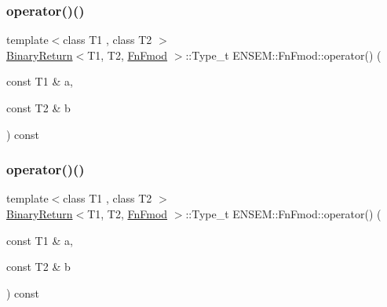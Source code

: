 \subsubsection{\texorpdfstring{operator()()}{operator()()}\hspace{0.1cm}{\footnotesize\ttfamily [1/3]}}
{\footnotesize\ttfamily template$<$class T1 , class T2 $>$ \\
\mbox{\hyperlink{structENSEM_1_1BinaryReturn}{Binary\+Return}}$<$T1, T2, \mbox{\hyperlink{structENSEM_1_1FnFmod}{Fn\+Fmod}} $>$\+::Type\+\_\+t E\+N\+S\+E\+M\+::\+Fn\+Fmod\+::operator() (\begin{DoxyParamCaption}\item[{const T1 \&}]{a,  }\item[{const T2 \&}]{b }\end{DoxyParamCaption}) const\hspace{0.3cm}{\ttfamily [inline]}}

\mbox{\label{structENSEM_1_1FnFmod_a3c0c1761f9aede2a2ec6382073727d3f}} 
\subsubsection{\texorpdfstring{operator()()}{operator()()}\hspace{0.1cm}{\footnotesize\ttfamily [2/3]}}
{\footnotesize\ttfamily template$<$class T1 , class T2 $>$ \\
\mbox{\hyperlink{structENSEM_1_1BinaryReturn}{Binary\+Return}}$<$T1, T2, \mbox{\hyperlink{structENSEM_1_1FnFmod}{Fn\+Fmod}} $>$\+::Type\+\_\+t E\+N\+S\+E\+M\+::\+Fn\+Fmod\+::operator() (\begin{DoxyParamCaption}\item[{const T1 \&}]{a,  }\item[{const T2 \&}]{b }\end{DoxyParamCaption}) const\hspace{0.3cm}{\ttfamily [inline]}}

\mbox{\label{structENSEM_1_1FnFmod_a3c0c1761f9aede2a2ec6382073727d3f}} 

